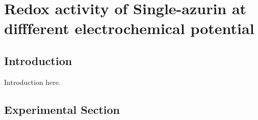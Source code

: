 \chapter{Redox activity of Single-azurin at diffferent electrochemical potential}
\graphicspath{{./chapters/c4_azurin_sm/main/}}
%  
\section{Introduction}
Introduction here.
\section{Experimental Section}

